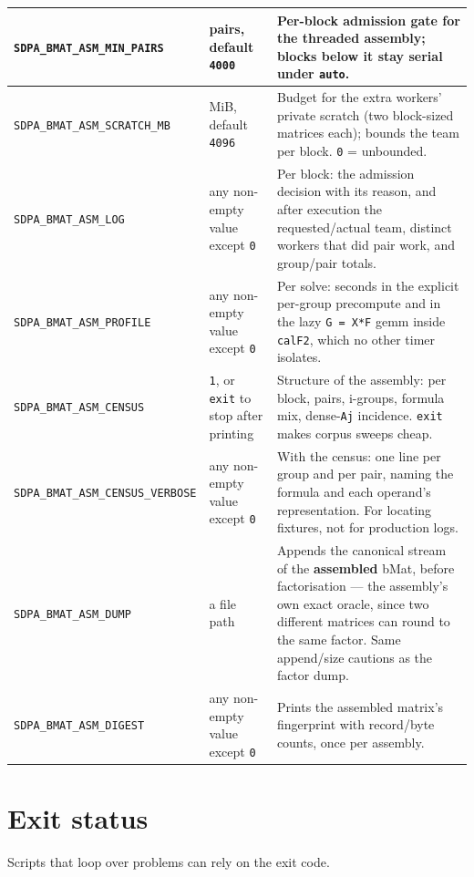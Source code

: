 \documentclass[11pt]{article}
\newcommand{\code}[1]{\texttt{#1}}
\begin{document}
\begin{longtable}{@{}p{}p{}p{}@{}}
\midrule
\code{SDPA\_BMAT\_ASM\_MIN\_PAIRS} & pairs, default \code{4000} & Per-block admission gate for the threaded assembly; blocks below it stay serial under \code{auto}. \\
\midrule
\code{SDPA\_BMAT\_ASM\_SCRATCH\_MB} & MiB, default \code{4096} & Budget for the extra workers' private scratch (two block-sized matrices each); bounds the team per block. \code{0} = unbounded. \\
\midrule
\code{SDPA\_BMAT\_ASM\_LOG} & any non-empty value except \code{0} & Per block: the admission decision with its reason, and after execution the requested/actual team, distinct workers that did pair work, and group/pair totals. \\
\midrule
\code{SDPA\_BMAT\_ASM\_PROFILE} & any non-empty value except \code{0} & Per solve: seconds in the explicit per-group precompute and in the lazy \code{G = X*F} gemm inside \code{calF2}, which no other timer isolates. \\
\midrule
\code{SDPA\_BMAT\_ASM\_CENSUS} & \code{1}, or \code{exit} to stop after printing & Structure of the assembly: per block, pairs, i-groups, formula mix, dense-\code{Aj} incidence. \code{exit} makes corpus sweeps cheap. \\
\midrule
\code{SDPA\_BMAT\_ASM\_CENSUS\_VERBOSE} & any non-empty value except \code{0} & With the census: one line per group and per pair, naming the formula and each operand's representation. For locating fixtures, not for production logs. \\
\midrule
\code{SDPA\_BMAT\_ASM\_DUMP} & a file path & Appends the canonical stream of the \textbf{assembled} bMat, before factorisation --- the assembly's own exact oracle, since two different matrices can round to the same factor. Same append/size cautions as the factor dump. \\
\midrule
\code{SDPA\_BMAT\_ASM\_DIGEST} & any non-empty value except \code{0} & Prints the assembled matrix's fingerprint with record/byte counts, once per assembly. \\
\midrule
\end{longtable}
\endgroup

\section{Exit status}
\label{sec:exit}

Scripts that loop over problems can rely on the exit code.
\end{document}

